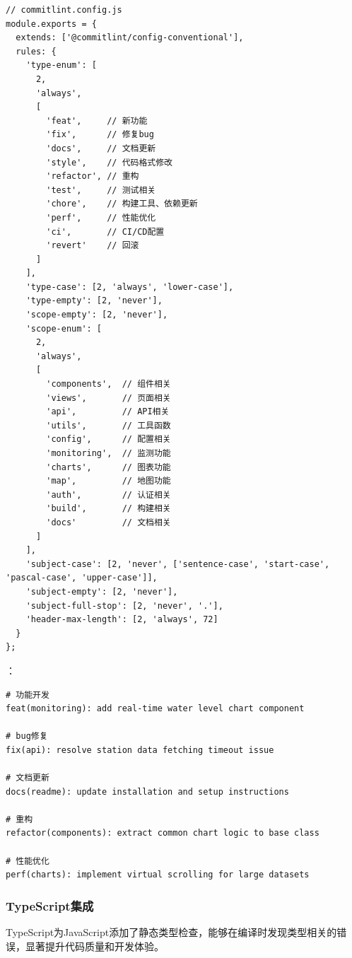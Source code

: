 \begin{lstlisting}[style=javascript]
// commitlint.config.js
module.exports = {
  extends: ['@commitlint/config-conventional'],
  rules: {
    'type-enum': [
      2,
      'always',
      [
        'feat',     // 新功能
        'fix',      // 修复bug
        'docs',     // 文档更新
        'style',    // 代码格式修改
        'refactor', // 重构
        'test',     // 测试相关
        'chore',    // 构建工具、依赖更新
        'perf',     // 性能优化
        'ci',       // CI/CD配置
        'revert'    // 回滚
      ]
    ],
    'type-case': [2, 'always', 'lower-case'],
    'type-empty': [2, 'never'],
    'scope-empty': [2, 'never'],
    'scope-enum': [
      2,
      'always',
      [
        'components',  // 组件相关
        'views',       // 页面相关
        'api',         // API相关
        'utils',       // 工具函数
        'config',      // 配置相关
        'monitoring',  // 监测功能
        'charts',      // 图表功能
        'map',         // 地图功能
        'auth',        // 认证相关
        'build',       // 构建相关
        'docs'         // 文档相关
      ]
    ],
    'subject-case': [2, 'never', ['sentence-case', 'start-case', 'pascal-case', 'upper-case']],
    'subject-empty': [2, 'never'],
    'subject-full-stop': [2, 'never', '.'],
    'header-max-length': [2, 'always', 72]
  }
};
\end{lstlisting}

：

\begin{lstlisting}[style=terminal]
# 功能开发
feat(monitoring): add real-time water level chart component

# bug修复  
fix(api): resolve station data fetching timeout issue

# 文档更新
docs(readme): update installation and setup instructions

# 重构
refactor(components): extract common chart logic to base class

# 性能优化
perf(charts): implement virtual scrolling for large datasets
\end{lstlisting}

\hypertarget{typescriptux96c6ux6210}{%
\subsubsection{TypeScript集成}\label{typescriptux96c6ux6210}}

TypeScript为JavaScript添加了静态类型检查，能够在编译时发现类型相关的错误，显著提升代码质量和开发体验。

